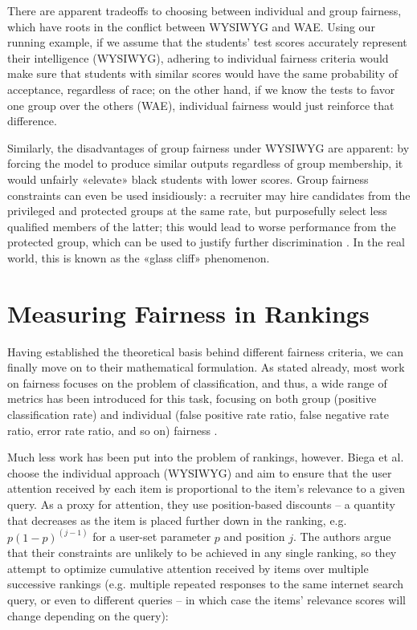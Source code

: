 There are apparent tradeoffs to choosing between individual and group fairness, which have roots in the conflict between WYSIWYG and WAE. Using our running example, if we assume that the students’ test scores accurately represent their intelligence (WYSIWYG), adhering to individual fairness criteria would make sure that students with similar scores would have the same probability of acceptance, regardless of race; on the other hand, if we know the tests to favor one group over the others (WAE), individual fairness would just reinforce that difference.

Similarly, the disadvantages of group fairness under WYSIWYG are apparent: by forcing the model to produce similar outputs regardless of group membership, it would unfairly «elevate» black students with lower scores. Group fairness constraints can even be used insidiously: a recruiter may hire candidates from the privileged and protected groups at the same rate, but purposefully select less qualified members of the latter; this would lead to worse performance from the protected group, which can be used to justify further discrimination \cite{fairmlbook}. In the real world, this is known as the «glass cliff» phenomenon.


\section{Measuring Fairness in Rankings}\label{sect:1_3}

Having established the theoretical basis behind different fairness criteria, we can finally move on to their mathematical formulation. As stated already, most work on fairness focuses on the problem of classification, and thus, a wide range of metrics has been introduced for this task, focusing on both group (positive classification rate) and individual (false positive rate ratio, false negative rate ratio, error rate ratio, and so on) fairness \cite{1810.08810}.

Much less work has been put into the problem of rankings, however. Biega et al. \cite{equityofattentionBiega} choose the individual approach (WYSIWYG) and aim to ensure that the user attention received by each item is proportional to the item’s relevance to a given query. As a proxy for attention, they use position-based discounts – a quantity that decreases as the item is placed further down in the ranking, e.g. $p(1 - p)^{(j-1)}$ for a user-set parameter $p$ and position $j$. The authors argue that their constraints are unlikely to be achieved in any single ranking, so they attempt to optimize cumulative attention received by items over multiple successive rankings (e.g. multiple repeated responses to the same internet search query, or even to different queries – in which case the items’ relevance scores will change depending on the query):

